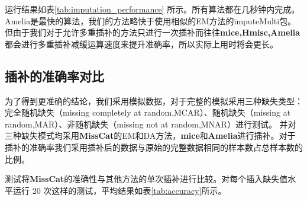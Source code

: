 \documentclass[12pt,hyperref,a4paper,UTF8]{ctexart}
\begin{document}
  
  \begin{table}[h]
  \caption{不同插补方法算法速度比较(单位毫秒(ms))}
  \label{tab:imputation_performance}
  \end{table}
  运行结果如表\ref{tab:imputation_performance} 所示。所有算法都在几秒钟内完成。Amelia是最快的算法，我们的方法略快于使用相似的EM方法的imputeMulti包。但由于我们对于允许多重插补的方法只进行一次插补而往往\textbf{mice,Hmisc,Amelia}都会进行多重插补减缓运算速度来提升准确率，所以实际上用时将会更长。  

  \subsection{插补的准确率对比}
  
  为了得到更准确的结论，我们采用模拟数据，对于完整的模拟采用三种缺失类型：完全随机缺失（missing completely at random,MCAR）、随机缺失（missing at random,MAR）、非随机缺失（missing not at random,MNAR）进行测试。
  并对三种缺失模式均采用\textbf{MissCat}的EM和DA方法，\textbf{mice}和\textbf{Amelia}进行插补。对于插补的准确率我们采用插补后的数据与原始的完整数据相同的样本数占总样本数的比例。
  
  测试将\textbf{MissCat}的准确性与其他方法的单次插补进行比较。对每个插入缺失值水平运行 20 次这样的测试，平均结果如表\ref{tab:accuracy}所示。
  
\end{document}
